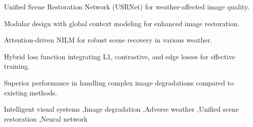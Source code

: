 \documentclass[final,12pt]{elsarticle}
\begin{document}
\begin{frontmatter}
\begin{abstract}
\end{abstract}
%
\begin{highlights}
    \item Unified Scene Restoration Network (USRNet) for weather-affected image quality.
    \item Modular design with global context modeling for enhanced image restoration.
    \item Attention-driven NILM for robust scene recovery in various weather.
    \item Hybrid loss function integrating L1, contrastive, and edge losses for effective training.
    \item Superior performance in handling complex image degradations compared to existing methods.
\end{highlights}
%
\begin{keyword}
    Intelligent visual systems
    \sep Image degradation 
    \sep Adverse weather
    \sep Unified scene restoration
    \sep Neural network
\end{keyword}
%
\end{frontmatter}
%
%
\end{document}

